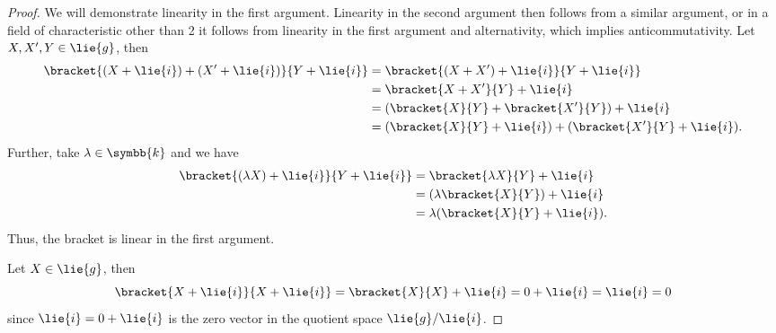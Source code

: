 \documentclass[fleqn]{NotesClass}
\renewcommand{\field}{\symbb{k}}
\begin{document}
\begin{lma}{}{}
\begin{proof}
            We will demonstrate linearity in the first argument.
            Linearity in the second argument then follows from a similar argument, or in a field of characteristic other than 2 it follows from linearity in the first argument and alternativity, which implies anticommutativity.
            Let \(X, X', Y \in \lie{g}\), then
            \begin{align}
                \bracket{(X + \lie{i}) + (X' + \lie{i})}{Y + \lie{i}} &= \bracket{(X + X') + \lie{i}}{Y + \lie{i}}\\
                &= \bracket{X + X'}{Y} + \lie{i}\\
                &= (\bracket{X}{Y} + \bracket{X'}{Y}) + \lie{i}\\
                &= (\bracket{X}{Y} + \lie{i}) + (\bracket{X'}{Y} + \lie{i}).
            \end{align}
            Further, take \(\lambda \in \field\) and we have
            \begin{align}
                \bracket{(\lambda X) + \lie{i}}{Y + \lie{i}} &= \bracket{\lambda X}{Y} + \lie{i}\\
                &= (\lambda \bracket{X}{Y}) + \lie{i}\\
                &= \lambda(\bracket{X}{Y} + \lie{i}).
            \end{align}
            Thus, the bracket is linear in the first argument.
            
            Let \(X \in \lie{g}\), then
            \begin{equation}
                \bracket{X + \lie{i}}{X + \lie{i}} = \bracket{X}{X} + \lie{i} = 0 + \lie{i} = \lie{i} = 0
            \end{equation}
            since \(\lie{i} = 0 + \lie{i}\) is the zero vector in the quotient space \(\lie{g}/\lie{i}\).
            

\end{proof}
\end{lma}
\end{document}
